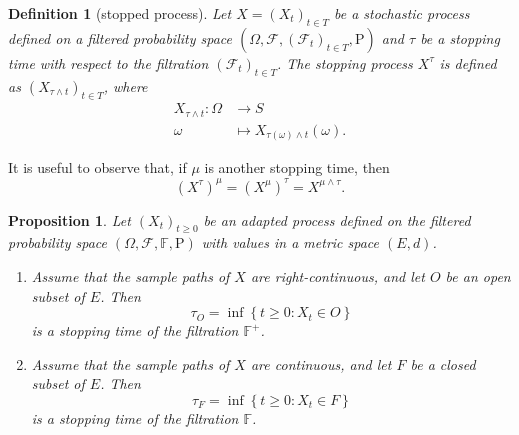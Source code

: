 \documentclass{report}
\newtheorem{definition}{Definition}[section]
\newtheorem{proposition}{Proposition}[section]
\theoremstyle{nonumberplain}
\begin{document}
\begin{definition}[stopped process]
	Let $X=(X_{t})_{t\in T}$ be a stochastic process defined on a filtered probability space $(\Omega,\mathcal{F},(\mathcal{F}_{t})_{t\in T},\mathrm{P})$ and $\tau$ be a stopping time with respect to the filtration $(\mathcal{F}_{t})_{t\in T}$. The stopping process $X^\tau$ is defined as $(X_{\tau \wedge t})_{t\in T}$, where
	\begin{align*}
	X_{\tau \wedge t}:\Omega&\longrightarrow S\\
	\omega&\longmapsto X_{\tau(\omega) \wedge t}(\omega).
	\end{align*}
\end{definition}
It is useful to observe that, if $\mu$ is another stopping time, then
\[
(X^\tau)^\mu=(X^\mu)^\tau=X^{\mu\wedge\tau}.
\]
\begin{proposition}
	Let $\left(X_{t}\right)_{t \geq 0}$ be an adapted process defined on the filtered probability space $(\Omega,\mathcal{F},\mathbb{F},\mathrm{P})$ with values in a metric space $(E, d)$.
	\begin{enumerate}  
		\item Assume that the sample paths of $X$ are right-continuous, and let $O$ be an open subset of $E$. Then
		\[
		\tau_{O}=\inf \left\{t \geq 0: X_{t} \in O\right\}
		\]
		is a stopping time of the filtration $\mathbb{F}^+$.
		\item Assume that the sample paths of $X$ are continuous, and let $F$ be a closed subset
		of $E$. Then
		\[
		\tau_{F}=\inf \left\{t \geq 0: X_{t} \in F\right\}
		\]
		is a stopping time of the filtration $\mathbb{F}$.
	\end{enumerate}
\end{proposition}
\end{document}
